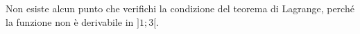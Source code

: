 Non esiste alcun punto che verifichi la condizione del teorema di Lagrange, 
perché la funzione non è derivabile in $]1;3[$.
